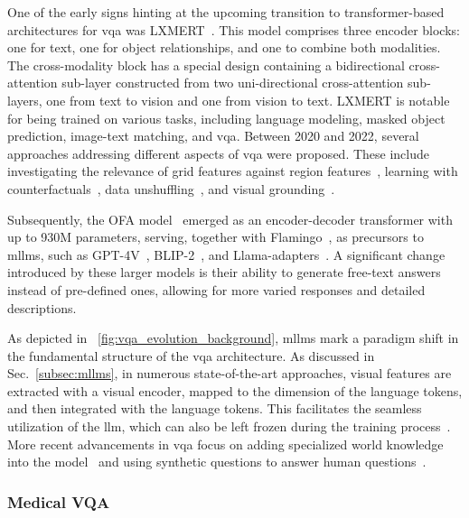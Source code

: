 One of the early signs hinting at the upcoming transition to transformer-based architectures for \gls{vqa} was LXMERT~\cite{tan2019lxmert}. This model comprises three encoder blocks: one for text, one for object relationships, and one to combine both modalities. The cross-modality block has a special design containing a bidirectional cross-attention sub-layer constructed from two uni-directional cross-attention sub-layers, one from text to vision and one from vision to text. LXMERT is notable for being trained on various tasks, including language modeling, masked object prediction, image-text matching, and \gls{vqa}. Between 2020 and 2022, several approaches addressing different aspects of \gls{vqa} were proposed. These include investigating the relevance of grid features against region features~\cite{jiang2020defense}, learning with counterfactuals~\cite{liang2020learning}, data unshuffling~\cite{teney2020unshuffling}, and visual grounding~\cite{khan2021reason}.

Subsequently, the OFA model~\cite{wang2022ofa} emerged as an encoder-decoder transformer with up to 930M parameters, serving, together with Flamingo~\cite{alayrac2022flamingo}, as precursors to \glspl{mllm}, such as GPT-4V~\cite{achiam2023gpt}, BLIP-2~\cite{li2023blip2}, and Llama-adapters~\cite{zhang2023llamaadapter,gao2023llamaadapter}. A significant change introduced by these larger models is their ability to generate free-text answers instead of pre-defined ones, allowing for more varied responses and detailed descriptions.

As depicted in \fig~\ref{fig:vqa_evolution_background}, \glspl{mllm} mark a paradigm shift in the fundamental structure of the \gls{vqa} architecture. As discussed in Sec.~\ref{subsec:mllms}, in numerous state-of-the-art approaches, visual features are extracted with a visual encoder, mapped to the dimension of the language tokens, and then integrated with the language tokens. This facilitates the seamless utilization of the \gls{llm}, which can also be left frozen during the training process~\cite{guo2023images}. More recent advancements in \gls{vqa} focus on adding specialized world knowledge into the model~\cite{wang2024qa} and using synthetic questions to answer human questions~\cite{kim2024generalizing}. 

\subsubsection{Medical VQA}

